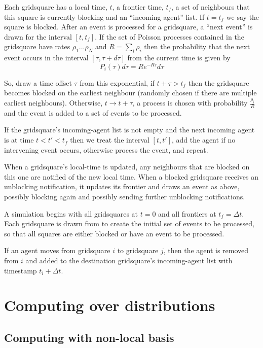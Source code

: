 \documentclass[a4paper]{article}
\begin{document}
Each gridsquare has a local time, $t$, a frontier time, $t_f$, a set of neighbours that this square is currently blocking and an ``incoming agent'' list. If $t=t_f$ we say the square is blocked. After an event is processed for a gridsquare, a ``next event'' is drawn for the interval $[t,t_f]$. If the set of Poisson processes contained in the gridsquare have rates $\rho_1...\rho_N$ and $R = \sum_i \rho_i$ then the probability that the next event occurs in the interval $[\tau, \tau+d\tau]$ from the current time is given by
\[
P_i(\tau)d\tau = Re^{-R\tau}d\tau
\]

So, draw a time offset $\tau$ from this exponential, if $t + \tau > t_f$ then the gridsquare becomes blocked on the earliest neighbour (randomly chosen if there are multiple earliest neighbours). Otherwise, $t \to t + \tau$, a process is chosen with probability $\frac{\rho_i}{R}$ and the event is added to a set of events to be processed.

If the gridsquare's incoming-agent list is not empty and the next incoming agent is at time  $t < t' < t_f$ then we treat the interval $[t, t']$, add the agent if no intervening event occurs, otherwise process the event, and repeat.

When a gridsquare's local-time is updated, any neighbours that are blocked on this one are notified of the new local time. When a blocked gridsquare receives an unblocking notification, it updates its frontier and draws an event as above, possibly blocking again and possibly sending further unblocking notifications.

A simulation begins with all gridsquares at $t=0$ and all frontiers at $t_f=\Delta t$. Each gridsquare is drawn from to create the initial set of events to be processed, so that all squares are either blocked or have an event to be processed.

If an agent moves from gridsquare $i$ to gridsquare $j$, then the agent is removed from $i$ and added to the destination gridsquare's incoming-agent list with timestamp $t_i + \Delta t$.

\section{Computing over distributions}

\subsection{Computing with non-local basis}
\end{document}
